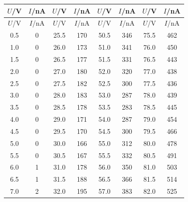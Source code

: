 {\footnotesize
\setlength{\tabcolsep}{5pt}
\renewcommand{\arraystretch}{1.15}
\begin{longtable}{cccccccc}
\toprule

$U$/V & $I$/nA & $U$/V & $I$/nA & $U$/V & $I$/nA & $U$/V & $I$/nA \\

\midrule

\endfirsthead

\toprule

$U$/V & $I$/nA & $U$/V & $I$/nA & $U$/V & $I$/nA & $U$/V & $I$/nA \\

\midrule

\endhead

\bottomrule

\endfoot

0.5 & 0 & 25.5 & 170 & 50.5 & 346 & 75.5 & 462 \\

1.0 & 0 & 26.0 & 173 & 51.0 & 341 & 76.0 & 450 \\

1.5 & 0 & 26.5 & 177 & 51.5 & 331 & 76.5 & 443 \\

2.0 & 0 & 27.0 & 180 & 52.0 & 320 & 77.0 & 438 \\

2.5 & 0 & 27.5 & 182 & 52.5 & 300 & 77.5 & 436 \\

3.0 & 0 & 28.0 & 183 & 53.0 & 287 & 78.0 & 439 \\

3.5 & 0 & 28.5 & 178 & 53.5 & 283 & 78.5 & 445 \\

4.0 & 0 & 29.0 & 171 & 54.0 & 287 & 79.0 & 454 \\

4.5 & 0 & 29.5 & 170 & 54.5 & 300 & 79.5 & 466 \\

5.0 & 0 & 30.0 & 166 & 55.0 & 312 & 80.0 & 478 \\

5.5 & 0 & 30.5 & 167 & 55.5 & 332 & 80.5 & 491 \\

6.0 & 1 & 31.0 & 178 & 56.0 & 350 & 81.0 & 503 \\

6.5 & 1 & 31.5 & 188 & 56.5 & 366 & 81.5 & 514 \\

7.0 & 2 & 32.0 & 195 & 57.0 & 383 & 82.0 & 525 \\


\end{longtable}}
